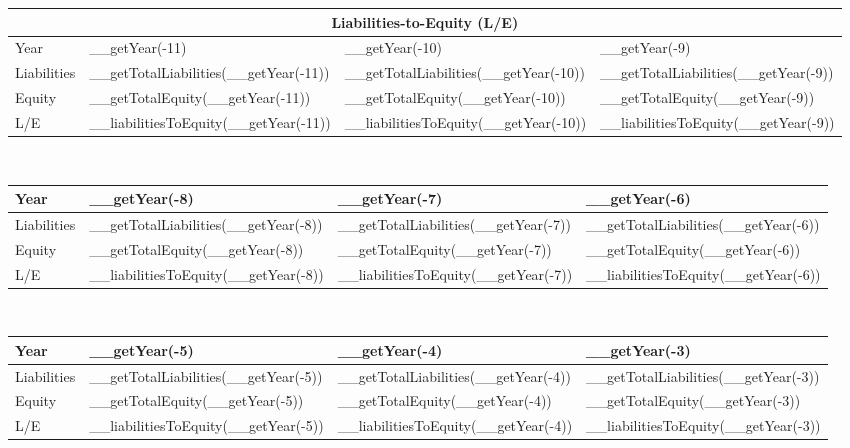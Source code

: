 \begin{tabularx}{\textwidth}{|X|X|X|X|}
 \hline
 \multicolumn{4}{|c|}{Liabilities-to-Equity (L/E)} \\
 \hline
 Year                     & __getYear(-11)                        & __getYear(-10)                        & __getYear(-9)                        \\
 \hline
 Liabilities              & __getTotalLiabilities(__getYear(-11)) & __getTotalLiabilities(__getYear(-10)) & __getTotalLiabilities(__getYear(-9)) \\
 Equity                   & __getTotalEquity(__getYear(-11))      & __getTotalEquity(__getYear(-10))      & __getTotalEquity(__getYear(-9))      \\
 \rowcolor{lightgray} L/E & __liabilitiesToEquity(__getYear(-11)) & __liabilitiesToEquity(__getYear(-10)) & __liabilitiesToEquity(__getYear(-9)) \\
 \hline
\end{tabularx}\\

\begin{tabularx}{\textwidth}{|X|X|X|X|}
 \hline
 Year                     & __getYear(-8)                        & __getYear(-7)                        & __getYear(-6)                        \\
 \hline
 Liabilities              & __getTotalLiabilities(__getYear(-8)) & __getTotalLiabilities(__getYear(-7)) & __getTotalLiabilities(__getYear(-6)) \\
 Equity                   & __getTotalEquity(__getYear(-8))      & __getTotalEquity(__getYear(-7))      & __getTotalEquity(__getYear(-6))      \\
 \rowcolor{lightgray} L/E & __liabilitiesToEquity(__getYear(-8)) & __liabilitiesToEquity(__getYear(-7)) & __liabilitiesToEquity(__getYear(-6)) \\
 \hline
\end{tabularx}\\

\begin{tabularx}{\textwidth}{|X|X|X|X|}
 \hline
 Year                     & __getYear(-5)                        & __getYear(-4)                        & __getYear(-3)                        \\
 \hline
 Liabilities              & __getTotalLiabilities(__getYear(-5)) & __getTotalLiabilities(__getYear(-4)) & __getTotalLiabilities(__getYear(-3)) \\
 Equity                   & __getTotalEquity(__getYear(-5))      & __getTotalEquity(__getYear(-4))      & __getTotalEquity(__getYear(-3))      \\
 \rowcolor{lightgray} L/E & __liabilitiesToEquity(__getYear(-5)) & __liabilitiesToEquity(__getYear(-4)) & __liabilitiesToEquity(__getYear(-3)) \\
 \hline
\end{tabularx}\\

